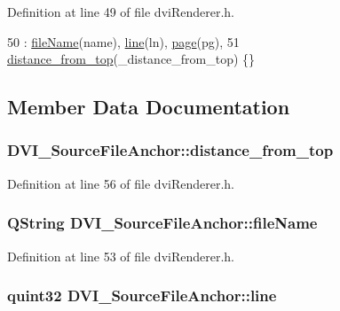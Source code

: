 Definition at line 49 of file dvi\+Renderer.\+h.


\begin{DoxyCode}
50     : \hyperlink{classDVI__SourceFileAnchor_a9e8fbd464c09df77dbbaee5018efe85c}{fileName}(name), \hyperlink{classDVI__SourceFileAnchor_ada7ea524ce6a9fa2a4e40b9b17ce3234}{line}(ln), \hyperlink{classDVI__SourceFileAnchor_a0e6c40abda8f0a8c4076bc0dee5c6691}{page}(pg),
51       \hyperlink{classDVI__SourceFileAnchor_af842eeb8d0e00ff713d57bfadd7fe1cf}{distance\_from\_top}(\_distance\_from\_top) \{\}
\end{DoxyCode}


\subsection{Member Data Documentation}
\hypertarget{classDVI__SourceFileAnchor_af842eeb8d0e00ff713d57bfadd7fe1cf}{
\subsubsection[{distance\+\_\+from\+\_\+top}]{ D\+V\+I\+\_\+\+Source\+File\+Anchor\+::distance\+\_\+from\+\_\+top}}\label{classDVI__SourceFileAnchor_af842eeb8d0e00ff713d57bfadd7fe1cf}


Definition at line 56 of file dvi\+Renderer.\+h.

\hypertarget{classDVI__SourceFileAnchor_a9e8fbd464c09df77dbbaee5018efe85c}{
\subsubsection[{file\+Name}]{\setlength{\rightskip}{0pt plus 5cm}Q\+String D\+V\+I\+\_\+\+Source\+File\+Anchor\+::file\+Name}}\label{classDVI__SourceFileAnchor_a9e8fbd464c09df77dbbaee5018efe85c}


Definition at line 53 of file dvi\+Renderer.\+h.

\hypertarget{classDVI__SourceFileAnchor_ada7ea524ce6a9fa2a4e40b9b17ce3234}{
\subsubsection[{line}]{\setlength{\rightskip}{0pt plus 5cm}quint32 D\+V\+I\+\_\+\+Source\+File\+Anchor\+::line}}\label{classDVI__SourceFileAnchor_ada7ea524ce6a9fa2a4e40b9b17ce3234}


